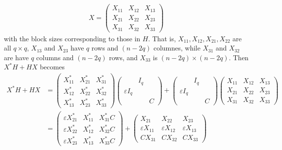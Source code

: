 \documentclass[12pt]{article}
\theoremstyle{definition}
\numberwithin{theorem}{subsection}
\newcommand{\eps}{\varepsilon}
\begin{document}
\begin{align*}
	X = \begin{pmatrix}
		X_{11} & X_{12} & X_{13} \\
		X_{21} & X_{22} & X_{23} \\
		X_{31} & X_{32} & X_{33}
		\end{pmatrix}
\end{align*}
with the block sizes corresponding to those in $H$. That is, $X_{11}, X_{12}, X_{21}, X_{22}$ are all $q \times q$, $X_{13}$ and $X_{23}$ have $q$ rows and $(n-2q)$ columnes, while $X_{31}$ and $X_{32}$ are have $q$ columns and $(n-2q)$ rows, and $X_{33}$ is $(n-2q) \times (n-2q)$. Then $X^* H + HX$ becomes
\begin{align*}
		X^* H + H X &=
		\begin{pmatrix}
			X_{11}^* & X_{21}^* & X_{31}^* \\
			X_{12}^* & X_{22}^* & X_{32}^* \\
			X_{13}^* & X_{23}^* & X_{33}^*
		\end{pmatrix}
		\begin{pmatrix}
		 	 & I_q &  \\
			\eps I_q &  & \\
			 &  & C
		\end{pmatrix}
		+
		\begin{pmatrix}
		 	 & I_q &  \\
			\eps I_q &  & \\
			 &  & C
		\end{pmatrix}
		\begin{pmatrix}
			 X_{11} &  X_{12} &  X_{13} \\
			 X_{21} &  X_{22} &  X_{23} \\
			 X_{31} &  X_{32} &  X_{33}
		\end{pmatrix} \\
		&=
		\begin{pmatrix}
			\eps X_{21}^* & X_{11}^* & X_{31}^* C \\
			\eps X_{22}^* & X_{12}^* & X_{32}^* C\\
			\eps X_{23}^* & X_{13}^* & X_{33}^* C 
		\end{pmatrix}
		+
		\begin{pmatrix}
			 X_{21} &  X_{22} &  X_{23} \\
		 	 \eps X_{11} &  \eps X_{12} &  \eps X_{13} \\
		 	C  X_{31} & C  X_{32} & C  X_{33}
		\end{pmatrix}
\end{align*}
\end{document}
